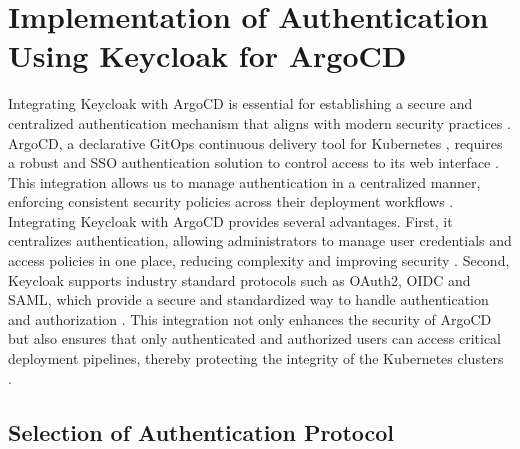 \clearpage

\section{Implementation of Authentication Using Keycloak for ArgoCD}

Integrating Keycloak with ArgoCD is essential for establishing a secure and centralized authentication mechanism that aligns with modern security practices \cite{argocd_docs}. ArgoCD, a declarative GitOps continuous delivery tool for Kubernetes \cite{argocd_docs}, requires a robust and SSO authentication solution to control access to its web interface \cite{keycloak_doc}. This integration allows us to manage authentication in a centralized manner, enforcing consistent security policies across their deployment workflows \cite{redhat_docs}. Integrating Keycloak with ArgoCD provides several advantages. First, it centralizes authentication, allowing administrators to manage user credentials and access policies in one place, reducing complexity and improving security \cite{redhat_docs}. Second, Keycloak supports industry standard protocols such as OAuth2, OIDC and SAML, which provide a secure and standardized way to handle authentication and authorization \cite{oauth_oidc_intro}. This integration not only enhances the security of ArgoCD but also ensures that only authenticated and authorized users can access critical deployment pipelines, thereby protecting the integrity of the Kubernetes clusters \cite{Kubernetes_doc}.

\subsection{Selection of Authentication Protocol}

